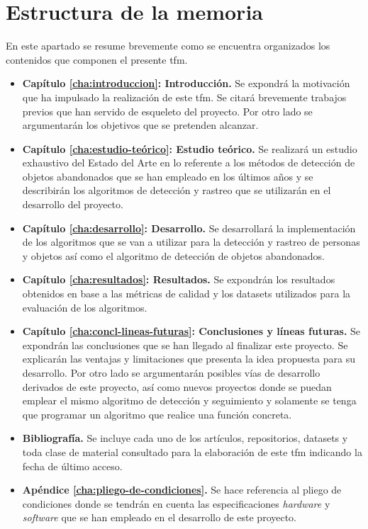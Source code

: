 \section{Estructura de la memoria}
\label{sec:estructura-memoria}
En este apartado se resume brevemente como se encuentra organizados los contenidos que componen el presente \gls{tfm}.

\begin{itemize}
    \item \textbf{Capítulo \ref{cha:introduccion}: Introducción.} Se expondrá la motivación que ha impulsado la realización de este \gls{tfm}. Se citará brevemente trabajos previos que han servido de esqueleto del proyecto. Por otro lado se argumentarán los objetivos que se pretenden alcanzar.
    \item \textbf{Capítulo \ref{cha:estudio-teórico}: Estudio teórico.} Se realizará un estudio exhaustivo del Estado del Arte en lo referente a los métodos de detección de objetos abandonados que se han empleado en los últimos años y se describirán los algoritmos de detección y rastreo que se utilizarán en el desarrollo del proyecto.
    \item \textbf{Capítulo \ref{cha:desarrollo}: Desarrollo.} Se desarrollará la implementación de los algoritmos que se van a utilizar para la detección y rastreo de personas y objetos así como el algoritmo de detección de objetos abandonados.
    \item \textbf{Capítulo \ref{cha:resultados}: Resultados.} Se expondrán los resultados obtenidos en base a las métricas de calidad y los datasets utilizados para la evaluación de los algoritmos.
    \item \textbf{Capítulo \ref{cha:concl-lineas-futuras}: Conclusiones y líneas futuras.} Se expondrán las conclusiones que se han llegado al finalizar este proyecto. Se explicarán las ventajas y limitaciones que presenta la idea propuesta para su desarrollo. Por otro lado se argumentarán posibles vías de desarrollo derivados de este proyecto, así como nuevos proyectos donde se puedan emplear el mismo algoritmo de detección y seguimiento y solamente se tenga que programar un algoritmo que realice una función concreta.
    \item \textbf{Bibliografía.} Se incluye cada uno de los artículos, repositorios, datasets y toda clase de material consultado para la elaboración de este \gls{tfm} indicando la fecha de último acceso. 
    \item \textbf{Apéndice \ref{cha:pliego-de-condiciones}.} Se hace referencia al pliego de condiciones donde se tendrán en cuenta las especificaciones \textit{hardware} y \textit{software} que se han empleado en el desarrollo de este proyecto.

\end{itemize}
